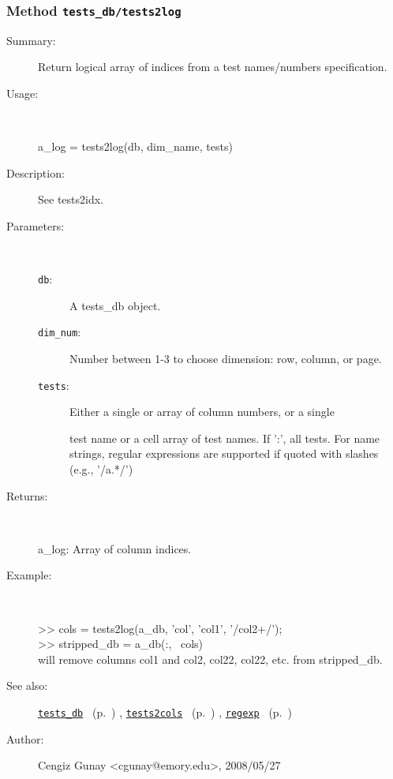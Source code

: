 \subsubsection[Method \texttt{tests2log}]{Method \texttt{tests\_db/tests2log}}%
%
\label{ref_tests_db__tests2log}%
\hypertarget{ref_tests_db__tests2log}{}%
\begin{description}
\item[Summary:]Return logical array of indices from a test names/numbers specification.
%
\item[Usage:]~%
\begin{lyxcode}%
a\_log = tests2log(db, dim\_name, tests)
%
\end{lyxcode}%
%
\item[Description:]%
See tests2idx.
\item[Parameters:]~
\begin{description}%
\item[\texttt{db}:]
 A tests\_db object.
\item[\texttt{dim\_num}:]
 Number between 1-3 to choose dimension: row, column, or page.
\item[\texttt{tests}:]
 Either a single or array of column numbers, or a single

test name or a cell array of test names. If ':', all
tests. For name strings, regular expressions are
supported if quoted with slashes (e.g., '/a.*/')
\end{description}%
%
\item[Returns:
]~

	a\_log: Array of column indices.
%
\item[Example:]~
\begin{lyxcode} >> cols = tests2log(a\_db, 'col', {'col1', '/col2+/'});
\\%
 >> stripped\_db = a\_db(:, ~cols)
\\%
 will remove columns col1 and col2, col22, col22, etc. from stripped\_db.
\\%
\end{lyxcode}
%
\item[See also:]%
\hyperlink{ref_tests_db}{\texttt{tests\_db}}%
\ (p.~\pageref{ref_tests_db})%
%
, \hyperlink{ref_tests2cols}{\texttt{tests2cols}}%
\ (p.~\pageref{ref_tests2cols})%
%
, \hyperlink{ref_regexp}{\texttt{regexp}}%
\ (p.~\pageref{ref_regexp})%
%
%
\item[Author:]%
Cengiz Gunay <cgunay@emory.edu>, 2008/05/27
%
\end{description}
\methodline%
